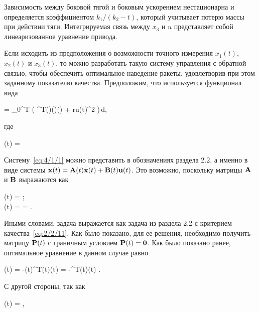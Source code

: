 Зависимость между боковой тягой и боковым ускорением нестационарна и определяется коэффициентом $k_1 / (k_2 - t)$, который учитывает потерю массы при действии тяги. Интегрируемая связь между $x_3$ и $u$ представляет собой линеаризованное уравнение привода.

Если исходить из предположения о возможности точного измерения $x_1(t)$, $x_2(t)$ и $x_3(t)$, то можно разработать такую систему управления с обратной связью, чтобы обеспечить оптимальное наведение ракеты, удовлетворив при этом заданному показателю качества. Предположим, что используется функционал вида

	\funcF =  \int\limits_0^T \bigl( ^T(\tau)(\tau)(\tau) + ru(t)^2 \bigr)\,d\tau \mbox{,}
\eeq

где

	(t) =  
\eeq

Систему~\ref{eq:4/1/1} можно представить в обозначениях раздела 2.2, а именно в виде системы $\mathbf{x}(t) = \mathbf{A}(t)\mathbf{x}(t) + \mathbf{B}(t)\mathbf{u}(t)$. Это возможно, поскольку матрицы $\mathbf{A}$ и $\mathbf{B}$ выражаются как

\beqarr
		(t) =  \mbox{;} \\
		(t) =  =  \mbox{.}
\eeqarr

Иными словами, задача выражается как задача из раздела 2.2 с критерием качества~\vref{eq:2/2/11}. Как было показано, для ее решения, необходимо получить матрицу $\mathbf{P}(t)$ с граничным условием $\mathbf{P}(t) = \mathbf{0}$. Как было показано ранее, оптимальное уравнение в данном случае равно

	\optU(t) = -(t)^T(t)(t) = -^T(t)(t) \mbox{.}
\eeq

С другой стороны, так как

	(t) =  \mbox{,}
\eeq


